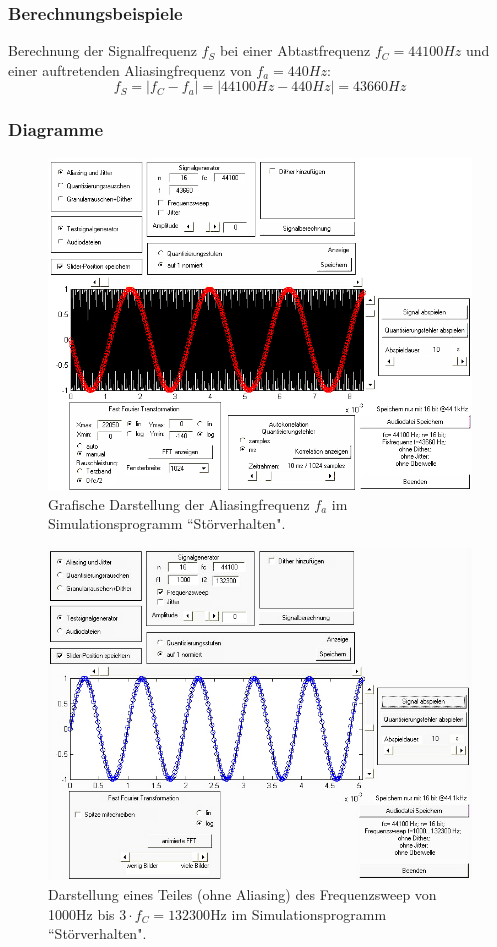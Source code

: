 \subsubsection{Berechnungsbeispiele}
Berechnung der Signalfrequenz $f_S$ bei einer Abtastfrequenz $f_C = 44100Hz$ und einer auftretenden Aliasingfrequenz von $f_a = 440Hz$:
\begin{equation}
 f_S = |f_C - f_a| = |44100Hz - 440Hz| = 43660Hz
\end{equation}
\pagebreak

\subsubsection{Diagramme}
\begin{figure}[h!]
\centering
\includegraphics[width=\columnwidth]{figures/Aufg1/1_1.JPG} 
\caption{Grafische Darstellung der Aliasingfrequenz $f_a$ im Simulationsprogramm ``Störverhalten".}
\end{figure}

\begin{figure}[h!]
\centering
\includegraphics[width=\columnwidth]{figures/Aufg1/1_2.JPG} 
\caption{Darstellung eines Teiles (ohne Aliasing) des Frequenzsweep von 1000Hz bis $3 \cdot f_C = 132300$Hz im Simulationsprogramm ``Störverhalten".}
\end{figure}

